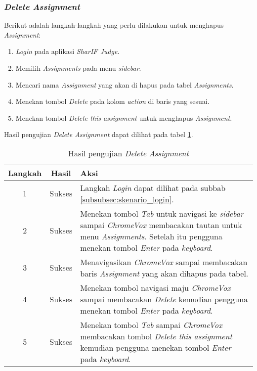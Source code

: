 \subsubsection{\textit{Delete Assignment}}
\label{subsubsec:skenario_delete_assignment}
Berikut adalah langkah-langkah yang perlu dilakukan untuk menghapus \textit{Assignment}:

\begin{enumerate}
	\item \textit{Login} pada aplikasi \textit{SharIF Judge}.
	\item Memilih \textit{Assignments} pada menu \textit{sidebar}.
	\item Mencari nama \textit{Assignment} yang akan di hapus pada tabel \textit{Assignments}.
	\item Menekan tombol \textit{Delete} pada kolom \textit{action} di baris yang sesuai.
	\item Menekan tombol \textit{Delete this assignment} untuk menghapus \textit{Assignment}.
\end{enumerate}

Hasil pengujian \textit{Delete Assignment} dapat dilihat pada tabel \ref{tab:hasil_delete_assignment}.

\begin{table}[H]
	\centering
	\caption{Hasil pengujian \textit{Delete Assignment}}
	\label{tab:hasil_delete_assignment}
	\begin{tabular}{|c|c|p{12cm}|}
		\toprule
		Langkah & Hasil & Aksi\\
		\midrule
		1 & Sukses & Langkah \textit{Login} dapat dilihat pada subbab \ref{subsubsec:skenario_login}.\\
		2 & Sukses & Menekan tombol \textit{Tab} untuk navigasi ke \textit{sidebar} sampai \textit{ChromeVox} membacakan tautan untuk menu \textit{Assignments}. Setelah itu pengguna menekan tombol \textit{Enter} pada \textit{keyboard}.\\
		3 & Sukses & Menavigasikan \textit{ChromeVox} sampai membacakan baris \textit{Assignment} yang akan dihapus pada tabel.\\
		4 & Sukses & Menekan tombol navigasi maju \textit{ChromeVox} sampai membacakan \textit{Delete} kemudian pengguna menekan tombol \textit{Enter} pada \textit{keyboard}.\\
		5 & Sukses & Menekan tombol \textit{Tab} sampai \textit{ChromeVox} membacakan tombol \textit{Delete this assignment} kemudian pengguna menekan tombol \textit{Enter} pada \textit{keyboard}.\\
		\bottomrule
	\end{tabular}
\end{table}

